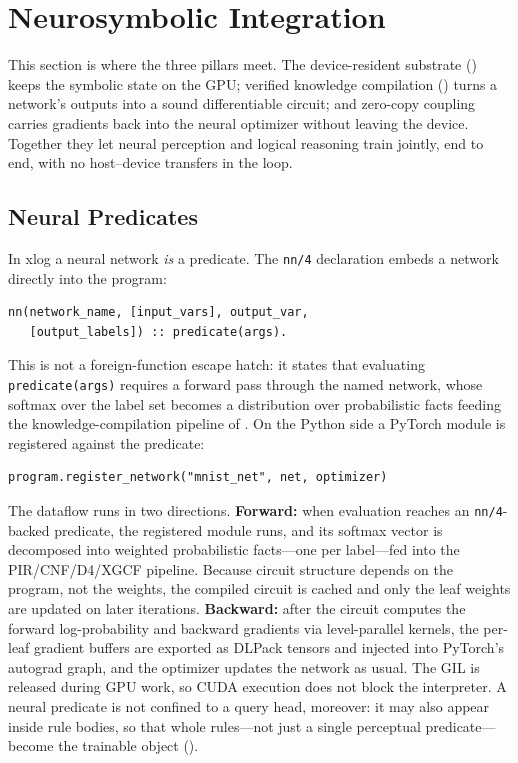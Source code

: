 \section{Neurosymbolic Integration}\label{sec:nesy}

This section is where the three pillars meet. The device-resident substrate () keeps the symbolic state on the GPU; verified knowledge compilation () turns a network's outputs into a sound differentiable circuit; and zero-copy coupling carries gradients back into the neural optimizer without leaving the device. Together they let neural perception and logical reasoning train jointly, end to end, with no host--device transfers in the loop.

\subsection{Neural Predicates}\label{subsec:neural-pred}

In xlog a neural network \emph{is} a predicate. The \texttt{nn/4} declaration embeds a network directly into the program:

\begin{lstlisting}[style=xlogstyle,
                   caption={Neural predicate declaration (\texttt{nn/4}).},
                   label={lst:nn-decl}]
nn(network_name, [input_vars], output_var,
   [output_labels]) :: predicate(args).
\end{lstlisting}

This is not a foreign-function escape hatch: it states that evaluating \texttt{predicate(args)} requires a forward pass through the named network, whose softmax over the label set becomes a distribution over probabilistic facts feeding the knowledge-compilation pipeline of . On the Python side a PyTorch module is registered against the predicate:

\begin{lstlisting}[style=pythonstyle,
                   caption={Registering a PyTorch module against a neural predicate.},
                   label={lst:nn-register}]
program.register_network("mnist_net", net, optimizer)
\end{lstlisting}

The dataflow runs in two directions. \textbf{Forward:} when evaluation reaches an \texttt{nn/4}-backed predicate, the registered module runs, and its softmax vector is decomposed into weighted probabilistic facts---one per label---fed into the PIR/CNF/D4/XGCF pipeline. Because circuit structure depends on the program, not the weights, the compiled circuit is cached and only the leaf weights are updated on later iterations. \textbf{Backward:} after the circuit computes the forward log-probability and backward gradients via level-parallel kernels, the per-leaf gradient buffers are exported as DLPack tensors and injected into PyTorch's autograd graph, and the optimizer updates the network as usual. The GIL is released during GPU work, so CUDA execution does not block the interpreter. A neural predicate is not confined to a query head, moreover: it may also appear inside rule bodies, so that whole rules---not just a single perceptual predicate---become the trainable object ().

